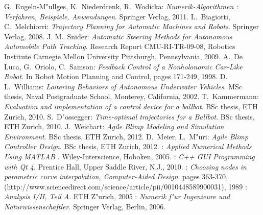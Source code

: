 \begin{thebibliography}{99}



 {\sc G.~Engeln-M"ullges, K.~Niederdrenk, R.~Wodicka}:
{\it Numerik-Algorithmen : Verfahren, Beispiele, Anwendungen}. Springer Verlag, 2011.
 {\sc L.~Biagiotti, C.~Melchiorri}:
{\it Trajectory Planning for Automatic Machines and Robots}. Springer Verlag, 2008.
 {\sc J. M.~Snider}:
{\it Automatic Steering Methods for Autonomous Automobile Path Tracking}. Research Report CMU-RI-TR-09-08, Robotics Institute Carnegie Mellon University Pittsburgh, Pennsylvania, 2009.
 {\sc A.~De Luca, G.~Oriolo, C.~Samson}:
{\it Feedback Control of a Nonholonomic Car-Like Robot}. In Robot Motion Planning and Control, pages 171-249, 1998.
 {\sc D. L.~Williams}:
{\it Loitering Behaviors of Autonomous Underwater Vehicles}. MSc thesis, Naval Postgraduate School, Monterey, California, 2002.
 {\sc T.~Kammermann}:
{\it Evaluation and implementation of a control device for a ballbot}. BSc thesis, ETH Zurich, 2010.
 {\sc S.~D"ossegger}:
{\it Time-optimal trajectories for a Ballbot}. BSc thesis, ETH Zurich, 2010.
 {\sc J.~Weichart}:
{\it Agile Blimp Modeling and Simulation Environment}. BSc thesis, ETH Zurich, 2012.
 {\sc D.~Meier, L.~M"uri}:
{\it Agile Blimp Controller Design}. BSc thesis, ETH Zurich, 2012.
:
{\it Applied Numerical Methods Using MATLAB} . Wiley-Interscience, Hoboken, 2005.
:
{\it C++ GUI Programming with Qt 4}. Prentice Hall, Upper Saddle River, N.J., 2010.
:
{\it Choosing nodes in parametric curve interpolation, Computer-Aided Design}. pages 363-370, (http://www.sciencedirect.com/science/article/pii/0010448589900031), 1989
:
{\it Analysis I/II, Teil A}. ETH Z"urich, 2005
:
{\it Numerik f"ur Ingenieure und Naturwissenschaftler}. Springer Verlag, Berlin, 2006.

\end{thebibliography}
